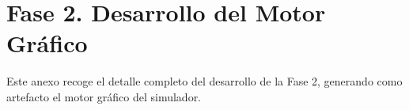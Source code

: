 \documentclass[../main.tex]{subfiles}
\begin{document}
	\chapter{Fase 2. Desarrollo del Motor Gráfico}
	\label{sec:DerarrolloFase2}
	
	Este anexo recoge el detalle completo del desarrollo de la Fase 2, generando como artefacto el motor gráfico del simulador.
	
	
	
	
	
	
	
		
	\clearpage
	
\end{document}
